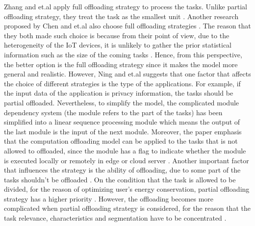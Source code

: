\documentclass[a4paper,11pt]{article}
\begin{document}
Zhang and et.al apply full offloading strategy to process the tasks. Unlike partial offloading strategy, they treat the task as the smallest unit \cite{no_cloud_1_density}. Another research proposed by Chen and et.al also choose full offloading strategies \cite{full_offload_2}. The reason that they both made such choice is because from their point of view, due to the heterogeneity of the IoT devices, it is unlikely to gather the prior statistical information such as the size of the coming tasks \cite{no_cloud_1_density,full_offload_2}. Hence, from this perspective, the better option is the full offloading strategy since it makes the model more general and realistic. %
\newline\newline
However, Ning and et.al suggests that one factor that affects the choice of different strategies is the type of the applications. For example, if the input data of the application is privacy information, the tasks should be partial offloaded. Nevertheless, to simplify the model, the complicated module dependency system (the module refers to the part of the tasks) has been simplified into a linear sequence processing module which means the output of the last module is the input of the next module. Moreover, the paper emphasis that the computation offloading model can be applied to the tasks that is not allowed to offloaded, since the module has a flag to indicate whether the module is executed locally or remotely in edge or cloud server \cite{A_Cooperative_Partial_Computation_Offloading_Scheme_for_Mobile_Edge}. 
\newline\newline
Another important factor that influences the strategy is the ability of offloading, due to some part of the tasks shouldn't be offloaded \cite{A_Cooperative_Partial_Computation_Offloading_Scheme_for_Mobile_Edge}. On the condition that the task is allowed to be divided, for the reason of optimizing user's energy conservation, partial offloading strategy has a higher priority \cite{save_energy}. However, the offloading becomes more complicated when partial offloading strategy is considered, for the reason that the task relevance, characteristics and segmentation have to be concentrated \cite{user_central}. \newline\newline
\end{document}
